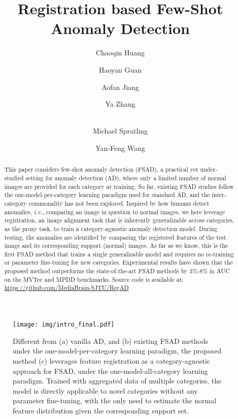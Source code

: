 \documentclass[runningheads]{llncs}
\begin{document}
\pagestyle{headings}
\mainmatter
\def\ECCVSubNumber{1729}  

\title{Registration based Few-Shot Anomaly Detection} 

\author{Chaoqin Huang \and
Haoyan Guan \and
Aofan Jiang \and
Ya Zhang \textsuperscript{\Letter} \and \\
Michael Spratling \and
Yan-Feng Wang \textsuperscript{\Letter}}
\maketitle

\begin{abstract}
This paper considers few-shot anomaly detection (FSAD), a practical yet under-studied setting for anomaly detection (AD), where only a limited number of normal images are provided for each category at training. So far, existing FSAD studies follow the one-model-per-category learning paradigm used for standard AD, and the inter-category commonality has not been explored. Inspired by how humans detect anomalies, \emph{i.e.,} comparing an image in question to normal images, we here leverage registration, an image alignment task that is inherently generalizable across categories, as the proxy task, to train a category-agnostic anomaly detection model. During testing, the anomalies are identified by comparing the registered features of the test image and its corresponding support (normal) images. As far as we know, this is the first FSAD method that trains a single generalizable model and requires no re-training or parameter fine-tuning for new categories. Experimental results have shown that the proposed method outperforms the state-of-the-art FSAD methods by 3\%-8\% in AUC on the MVTec and MPDD benchmarks. Source code is available at: \url{https://github.com/MediaBrain-SJTU/RegAD}
\end{abstract}

\begin{figure}[t]
\centering
\texttt{[image: img/intro\_final.pdf]}
\caption{Different from (a) vanilla AD, and (b) existing FSAD methods under the one-model-per-category learning paradigm, the proposed method (c) leverages feature registration as a category-agnostic approach for FSAD, under the one-model-all-category learning paradigm. Trained with aggregated data of multiple categories, the model is directly applicable to novel categories without any parameter fine-tuning, with the only need to estimate the normal feature distribution given the corresponding support set.}
\label{img:intro}
\end{figure}
\end{document}
